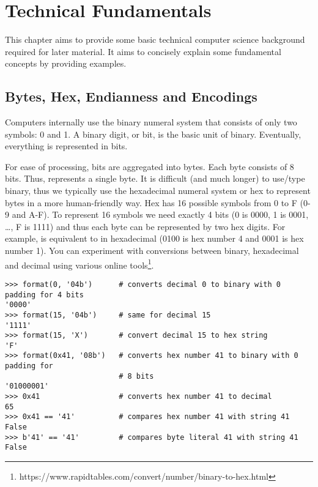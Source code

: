 \chapter{Technical Fundamentals}

\begin{summary}
This chapter aims to provide some basic technical computer science background required for later material. It aims to concisely explain some fundamental concepts by providing examples. 
\end{summary}

\section{Bytes, Hex, Endianness and Encodings}
Computers internally use the binary numeral system that consists of only two symbols: 0 and 1. A binary digit, or bit, is the basic unit of binary. Eventually, everything is represented in bits.

For ease of processing, bits are aggregated into bytes. Each byte consists of 8 bits. Thus,  represents a single byte. It is difficult (and much longer) to use/type binary, thus we typically use the hexadecimal numeral system or hex to represent bytes in a more human-friendly way. Hex has 16 possible symbols from 0 to F (0-9 and A-F). To represent 16 symbols we need exactly 4 bits (0 is 0000, 1 is 0001, …, F is 1111) and thus each byte can be represented by two hex digits. For example,  is equivalent to  in hexadecimal (0100 is hex number 4 and 0001 is hex number 1). You can experiment with conversions between binary, hexadecimal and decimal using various online tools\footnote{https://www.rapidtables.com/convert/number/binary-to-hex.html}.

\vspace{1em}
\begin{lstlisting}[style=Python,label={lst:encodings-1},caption={Python examples},captionpos=b]
>>> format(0, '04b')      # converts decimal 0 to binary with 0 padding for 4 bits
'0000'
>>> format(15, '04b')     # same for decimal 15
'1111'
>>> format(15, 'X')       # convert decimal 15 to hex string
'F'
>>> format(0x41, '08b')   # converts hex number 41 to binary with 0 padding for
                          # 8 bits
'01000001'
>>> 0x41                  # converts hex number 41 to decimal
65
>>> 0x41 == '41'          # compares hex number 41 with string 41
False
>>> b'41' == '41'         # compares byte literal 41 with string 41
False
\end{lstlisting}
\vspace{1em}


